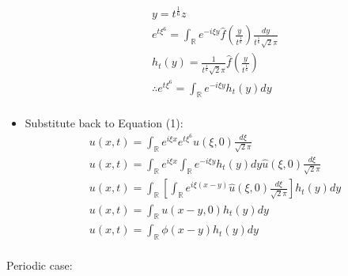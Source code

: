 \documentclass[12pt, a4paper]{article}
\begin{document}
\begin{itemize}
    \begin{gather*}
        y = t^{\frac{1}{6}}z\\
        e^{t\xi^6} = \int_{\mathbb{R}} e^{-i\xi y}\hat{f}\left(\frac{y}{t^\frac{1}{6}}\right)\frac{dy}{t^\frac{1}{6}\sqrt{2}\pi}\\
        h_t(y) = \frac{1}{t^\frac{1}{6}\sqrt{2}\pi}\hat{f}\left(\frac{y}{t^\frac{1}{6}}\right)\\
        \therefore e^{t\xi^6} = \int_{\mathbb{R}} e^{-i\xi y}h_t(y)dy\\
    \end{gather*}
    \item Substitute back to Equation (1):
    \begin{gather*}
        u(x, t) = \int_{\mathbb{R}} e^{i\xi x}e^{t\xi^6}\hat{u}(\xi, 0)\frac{d\xi}{\sqrt{2}\pi} \\ 
        u(x, t) = \int_{\mathbb{R}} e^{i\xi x}\int_{\mathbb{R}} e^{-i\xi y}h_t(y)dy\hat{u}(\xi, 0)\frac{d\xi}{\sqrt{2}\pi}\\
        u(x, t) = \int_{\mathbb{R}} \left[\int_{\mathbb{R}} e^{i\xi (x-y)}\hat{u}(\xi, 0)\frac{d\xi}{\sqrt{2}\pi}\right]h_t(y)dy\\
        u(x, t) = \int_{\mathbb{R}} u(x-y, 0) h_t(y)dy\\
        u(x, t) = \int_{\mathbb{R}} \phi(x-y) h_t(y)dy\\
    \end{gather*}
\end{itemize}
Periodic case:
\end{document}

